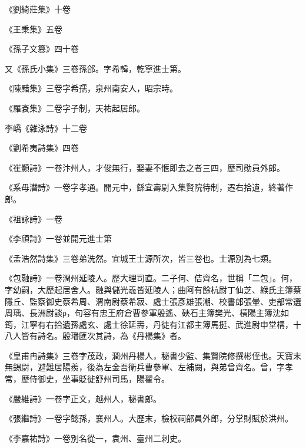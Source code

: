 \begin{pinyinscope}
 《劉綺莊集》十卷



 《王秉集》五卷



 《孫子文篡》四十卷



 又《孫氏小集》三卷孫郃。字希韓，乾寧進士第。



 《陳黯集》三卷字希孺，泉州南安人，昭宗時。



 《羅袞集》二卷字子制，天祐起居郎。



 李嶠《雜泳詩》十二卷



 《劉希夷詩集》四卷



 《崔顥詩》一卷汴州人，才俊無行，娶妻不愜即去之者三四，歷司勛員外郎。



 《系毋潛詩》一卷字孝通。開元中，繇宜壽尉入集賢院待制，遷右拾遺，終著作郎。



 《祖詠詩》一卷



 《李頎詩》一卷並開元進士第



 《孟浩然詩集》三卷弟洗然。宜城王士源所次，皆三卷也。士源別為七類。



 《包融詩》一卷潤州延陵人。歷大理司直。二子何、佶齊名，世稱「二包」。何，字幼嗣，大歷起居舍人。融與儲光羲皆延陵人；曲阿有餘杭尉丁仙芝、緱氏主簿蔡隱丘、監察御史蔡希周、渭南尉蔡希寂、處士張彥雄張潮、校書郎張暈、吏部常選周瑀、長洲尉談ρ，句容有忠王府倉曹參軍殷遙、硤石主簿樊光、橫陽主簿沈如筠，江寧有右拾遺孫處玄、處士徐延壽，丹徒有江都主簿馬挺、武進尉申堂構，十八人皆有詩名。殷璠匯次其詩，為《丹楊集》者。



 《皇甫冉詩集》三卷字茂政，潤州丹楊人，秘書少監、集賢院修撰彬侄也。天寶末無錫尉，避難居陽羨，後為左金吾衛兵曹參軍、左補闕，與弟曾齊名。曾，字孝常，歷侍御史，坐事貶徙舒州司馬，陽翟令。



 《嚴維詩》一卷字正文，越州人，秘書郎。



 《張繼詩》一卷字懿孫，襄州人。大歷末，檢校祠部員外郎，分掌財賦於洪州。



 《李嘉祐詩》一卷別名從一，袁州、臺州二刺史。




\end{pinyinscope}
